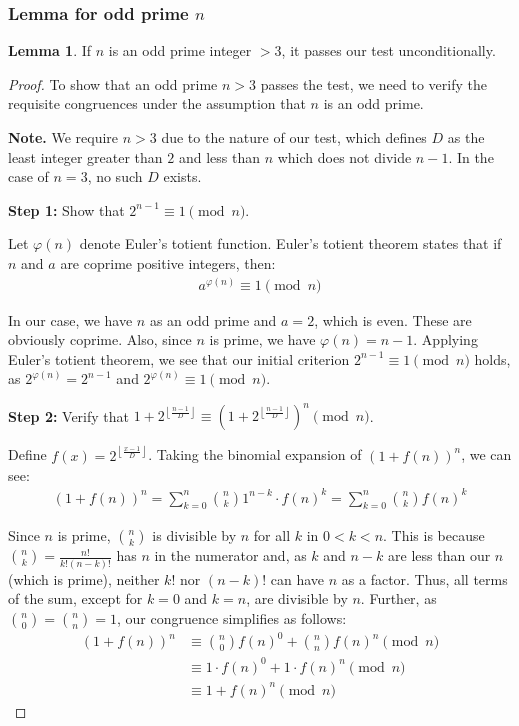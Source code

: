 \documentclass{article}
\theoremstyle{plain}
\theoremstyle{definition}
\newtheorem{lemma}{Lemma}
\begin{document}
\subsubsection[Lemma for odd prime n]{Lemma for odd prime $n$}

\begin{lemma} \label{lemma:primes}
    If $n$ is an odd prime integer $>3$, it passes our test unconditionally.
\end{lemma}
\begin{proof}
\label{proof:primes}
    To show that an odd prime $n > 3$ passes the test, we need to verify the requisite congruences under the assumption that $n$ is an odd prime.
    
    \textbf{Note.}
    We require $n > 3$ due to the nature of our test, which defines $D$ as the least integer greater than $2$ and less than $n$ which does not divide $n-1$. In the case of $n=3$, no such $D$ exists.

    \textbf{Step 1:} Show that $2^{n-1} \equiv 1 \pmod{n}$.

     Let $\varphi(n)$ denote Euler's totient function. Euler's totient theorem \cite{hardy2008} states that if $n$ and $a$ are coprime positive integers, then:
    \begin{align}
        a^{\varphi(n)} \equiv 1 \pmod{n}
    \end{align}
    
    In our case, we have $n$ as an odd prime and $a = 2$, which is even. These are obviously coprime. Also, since $n$ is prime, we have $\varphi(n) = n - 1$. Applying Euler's totient theorem, we see that our initial criterion $2^{n-1} \equiv 1 \pmod{n}$ holds, as $2^{\varphi(n)} = 2^{n-1}$ and $2^{\varphi(n)} \equiv 1 \pmod{n}$.

    \textbf{Step 2:} Verify that $1 + 2^{\left\lfloor \frac{n-1}{D} \right\rfloor} \equiv \left(1 + 2^{\left\lfloor \frac{n-1}{D} \right\rfloor}\right)^{n} \pmod{n}$. \label{proof:primes:step:2}

    Define $f(x) = 2^{\left\lfloor \frac{x-1}{D} \right\rfloor}$. Taking the binomial expansion of $(1 + f(n))^n$, we can see:
    \begin{align}
        (1 + f(n))^n = \sum_{k=0}^{n} \binom{n}{k} 1^{n-k} \cdot f(n)^k = \sum_{k=0}^{n} \binom{n}{k} f(n)^k
    \end{align}
    
    Since $n$ is prime, $\binom{n}{k}$ is divisible by $n$ for all $k$ in $0 < k < n$. This is because $\binom{n}{k} = \frac{n!}{k!(n-k)!}$ has $n$ in the numerator and, as $k$ and $n-k$ are less than our $n$ (which is prime), neither $k!$ nor $(n-k)!$ can have $n$ as a factor. Thus, all terms of the sum, except for $k = 0$ and $k = n$, are divisible by $n$. Further, as $\binom{n}{0} = \binom{n}{n} = 1$, our congruence simplifies as follows:
    \begin{align}
        (1 + f(n))^n &\equiv \binom{n}{0} f(n)^0 + \binom{n}{n} f(n)^n \pmod{n} \\
                     &\equiv 1 \cdot f(n)^0 + 1 \cdot f(n)^n \pmod{n} \\
                     &\equiv 1 + f(n)^n \pmod{n}
    \end{align}
    

\end{proof}
\end{document}
